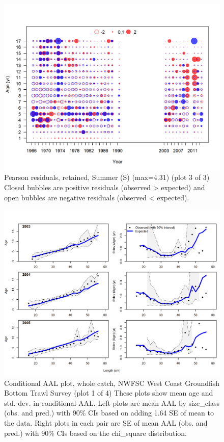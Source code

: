 \documentclass[12pt,]{article}
\begin{document}
\begin{figure}
\centering
\includegraphics{r4ss/plots_mod1/comp_agefit_residsflt4mkt2_page3.png}
\caption{Pearson residuals, retained, Summer (S) (max=4.31) (plot 3 of
3)\\
Closed bubbles are positive residuals (observed \textgreater{} expected)
and open bubbles are negative residuals (observed \textless{} expected).
\label{fig:ss_age_pearson}}
\end{figure}

\begin{figure}
\centering
\includegraphics{r4ss/plots_mod1/comp_condAALfit_Andre_plotsflt7mkt0_page1.png}
\caption{Conditional AAL plot, whole catch, NWFSC West Coast Groundfish
Bottom Trawl Survey (plot 1 of 4) These plots show mean age and std.
dev. in conditional AAL. Left plots are mean AAL by size\_class (obs.
and pred.) with 90\% CIs based on adding 1.64 SE of mean to the data.
Right plots in each pair are SE of mean AAL (obs. and pred.) with 90\%
CIs based on the chi\_square distribution.
\label{fig:nwfsc_combo_andre_1}}
\end{figure}
\end{document}
